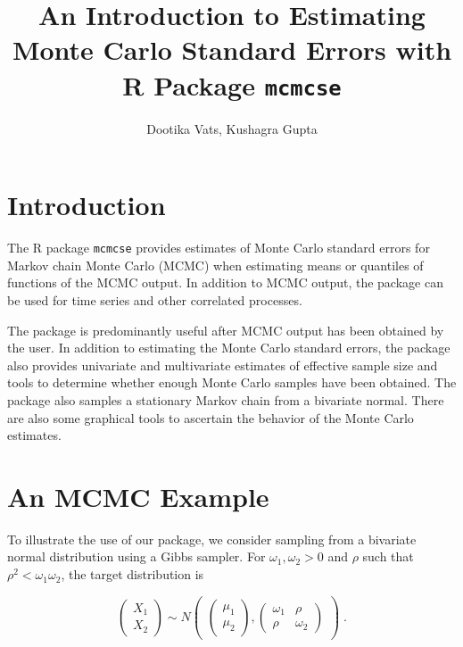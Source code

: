 \documentclass[11pt]{article}\usepackage[]{graphicx}\usepackage[]{color}
\title{An Introduction to Estimating Monte Carlo Standard Errors with R Package \texttt{mcmcse} }
\author{Dootika Vats, Kushagra Gupta}
\begin{document}
\maketitle
\setlength\parindent{0pt}
\tableofcontents

\break
\section{Introduction}
The R package \texttt{mcmcse} provides estimates of Monte Carlo standard errors for Markov chain Monte Carlo (MCMC) when estimating means or quantiles of functions of the MCMC output. In addition to MCMC output, the package can be used for time series and other correlated processes. 

The package is predominantly useful after MCMC output has been obtained by the user. In addition to estimating the Monte Carlo standard errors, the package also provides univariate and multivariate estimates of effective sample size and tools to determine whether enough Monte Carlo samples have been obtained. The package also samples a stationary Markov chain from a bivariate normal. There are also some graphical tools to ascertain the behavior of the Monte Carlo estimates.



\bigskip
\section{An MCMC Example}

To illustrate the use of our package, we consider sampling from a bivariate normal distribution using a Gibbs sampler. For $\omega_1, \omega_2 > 0$ and  $\rho$ such that $\rho^2 < \omega_1 \omega_2$, the target distribution is 

\[
\left(\begin{array}{c}
  X_1 \\ X_2
\end{array} \right) \sim 
 N \begin{pmatrix}
\begin{pmatrix}
\mu_{1}\\
\mu_{2}
\end{pmatrix}, 
\begin{pmatrix}
\omega_1 & \rho \\
\rho & \omega_2
\end{pmatrix}
\end{pmatrix} \; .
\]
\end{document}
